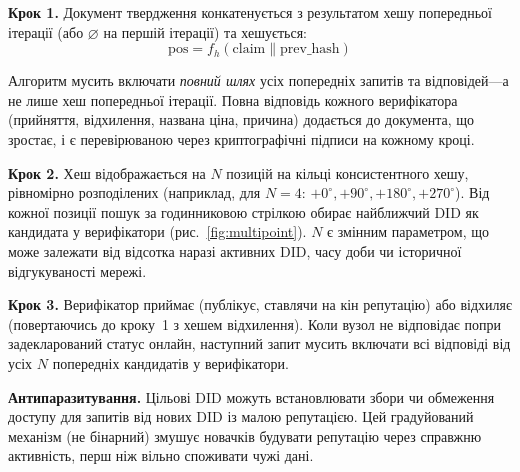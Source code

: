 \documentclass[11pt,a4paper,twocolumn]{article}
\begin{document}
\textbf{Крок 1.} Документ твердження конкатенується з результатом хешу попередньої ітерації (або $\varnothing$ на першій ітерації) та хешується:
\begin{equation}
\text{pos} = f_h(\text{claim} \| \text{prev\_hash})
\label{eq:hash}
\end{equation}

Алгоритм мусить включати \emph{повний шлях} усіх попередніх запитів та відповідей---а не лише хеш попередньої ітерації. Повна відповідь кожного верифікатора (прийняття, відхилення, названа ціна, причина) додається до документа, що зростає, і є перевірюваною через криптографічні підписи на кожному кроці.

\textbf{Крок 2.} Хеш відображається на $N$ позицій на кільці консистентного хешу, рівномірно розподілених (наприклад, для $N=4$: $+0^{\circ}, +90^{\circ}, +180^{\circ}, +270^{\circ}$). Від кожної позиції пошук за годинниковою стрілкою обирає найближчий DID як кандидата у верифікатори (рис.~\ref{fig:multipoint}). $N$ є змінним параметром, що може залежати від відсотка наразі активних DID, часу доби чи історичної відгукуваності мережі.

\textbf{Крок 3.} Верифікатор приймає (публікує, ставлячи на кін репутацію) або відхиляє (повертаючись до кроку~1 з хешем відхилення). Коли вузол не відповідає попри задекларований статус онлайн, наступний запит мусить включати всі відповіді від усіх $N$ попередніх кандидатів у верифікатори.

\textbf{Антипаразитування.} Цільові DID можуть встановлювати збори чи обмеження доступу для запитів від нових DID із малою репутацією. Цей градуйований механізм (не бінарний) змушує новачків будувати репутацію через справжню активність, перш ніж вільно споживати чужі дані.
\end{document}
